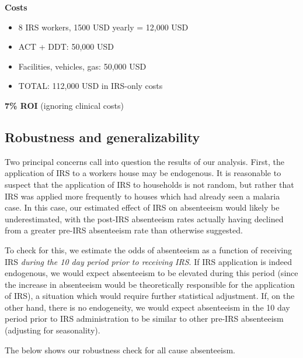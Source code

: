 \documentclass[]{article}
\providecommand{\tightlist}{%
  \setlength{\itemsep}{0pt}\setlength{\parskip}{0pt}}
\begin{document}
\textbf{Costs}

\begin{itemize}
\tightlist
\item
  8 IRS workers, 1500 USD yearly = 12,000 USD\\
\item
  ACT + DDT: 50,000 USD
\item
  Facilities, vehicles, gas: 50,000 USD\\
\item
  TOTAL: 112,000 USD in IRS-only costs
\end{itemize}

\textbf{7\% ROI} (ignoring clinical costs)

\newpage

\subsection{Robustness and
generalizability}\label{robustness-and-generalizability}

Two principal concerns call into question the results of our analysis.
First, the application of IRS to a workers house may be
endogenous.
It is reasonable to suspect that the application of IRS to households is
not random, but rather that IRS was applied more frequently to houses
which had already seen a malaria case. In this case, our estimated
effect of IRS on absenteeism would likely be underestimated, with the
post-IRS absenteeism rates actually having declined from a greater
pre-IRS absenteeism rate than otherwise suggested.

To check for this, we estimate the odds of absenteeism as a function of
receiving IRS \emph{during the 10 day period prior to receiving IRS}. If
IRS application is indeed endogenous, we would expect absenteeism to be
elevated during this period (since the increase in absenteeism would be
theoretically responsible for the application of IRS), a situation which
would require further statistical adjustment. If, on the other hand,
there is no endogeneity, we would expect absenteeism in the 10 day
period prior to IRS administration to be similar to other pre-IRS
absenteeism (adjusting for
seasonality).

The below shows our robustness check for all cause absenteeism.
\end{document}
